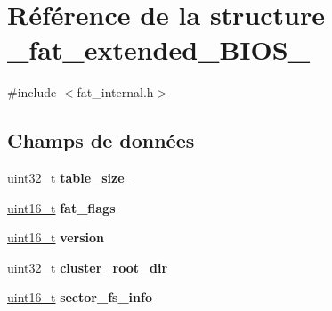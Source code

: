 \hypertarget{struct__fat__extended__BIOS__32}{\section{Référence de la structure \+\_\+fat\+\_\+extended\+\_\+\+B\+I\+O\+S\+\_}
\label{struct__fat__extended__BIOS__32}
}


{\ttfamily \#include $<$fat\+\_\+internal.\+h$>$}

\subsection*{Champs de données}
\begin{DoxyCompactItemize}
\item 
\hypertarget{struct__fat__extended__BIOS__32_afe9918174f4b717fe9ba858b792b6b76}{\hyperlink{kernel_2include_2types_8h_a33594304e786b158f3fb30289278f5af}{uint32\+\_\+t} {\bfseries table\+\_\+size\+\_}}\label{struct__fat__extended__BIOS__32_afe9918174f4b717fe9ba858b792b6b76}

\item 
\hypertarget{struct__fat__extended__BIOS__32_a58bc295c5eec01f9daec08d84340817e}{\hyperlink{kernel_2include_2types_8h_adf4d876453337156dde61095e1f20223}{uint16\+\_\+t} {\bfseries fat\+\_\+flags}}\label{struct__fat__extended__BIOS__32_a58bc295c5eec01f9daec08d84340817e}

\item 
\hypertarget{struct__fat__extended__BIOS__32_a9eb3b046449e1e1c868e1ecb1d6a9fe2}{\hyperlink{kernel_2include_2types_8h_adf4d876453337156dde61095e1f20223}{uint16\+\_\+t} {\bfseries version}}\label{struct__fat__extended__BIOS__32_a9eb3b046449e1e1c868e1ecb1d6a9fe2}

\item 
\hypertarget{struct__fat__extended__BIOS__32_a78cf2bb3768b41a3b054d6c71d5c61e7}{\hyperlink{kernel_2include_2types_8h_a33594304e786b158f3fb30289278f5af}{uint32\+\_\+t} {\bfseries cluster\+\_\+root\+\_\+dir}}\label{struct__fat__extended__BIOS__32_a78cf2bb3768b41a3b054d6c71d5c61e7}

\item 
\hypertarget{struct__fat__extended__BIOS__32_a38e8b2efc3921f696d435b878fc85007}{\hyperlink{kernel_2include_2types_8h_adf4d876453337156dde61095e1f20223}{uint16\+\_\+t} {\bfseries sector\+\_\+fs\+\_\+info}}\label{struct__fat__extended__BIOS__32_a38e8b2efc3921f696d435b878fc85007}


\end{DoxyCompactItemize}
